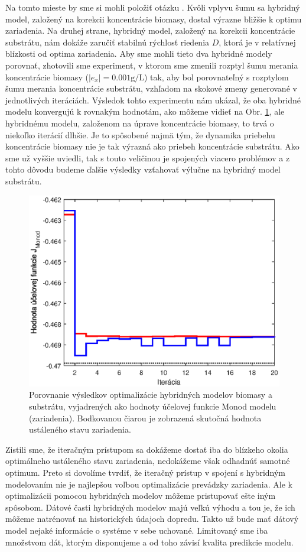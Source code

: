 Na tomto mieste by sme si mohli položiť otázku . Kvôli vplyvu šumu sa hybridný model, založený na korekcii koncentrácie biomasy, dostal výrazne bližšie k optimu zariadenia. Na druhej strane, hybridný model, založený na korekcii koncentrácie substrátu, nám dokáže zaručiť stabilnú rýchlosť riedenia $ D $, ktorá je v relatívnej blízkosti od optima zariadenia. Aby sme mohli tieto dva hybridné modely porovnať, zhotovili sme experiment, v ktorom sme zmenili rozptyl šumu merania koncentrácie biomasy ($ \left|e_{x}\right| = 0.001\si{\gram\per\liter} $) tak, aby bol porovnateľný s rozptylom šumu merania koncentrácie substrátu, vzhľadom na skokové zmeny generované v jednotlivých iteráciách. Výsledok tohto experimentu nám ukázal, že oba hybridné modelu konvergujú k rovnakým hodnotám, ako môžeme vidieť na Obr. \ref{fig:hybrid_sub_and_bio_compar}, ale hybridnému modelu, založenom na úprave koncentrácie biomasy, to trvá o niekoľko iterácií dlhšie. Je to spôsobené najmä tým, že dynamika priebehu koncentrácie biomasy nie je tak výrazná ako priebeh koncentrácie substrátu. Ako sme už vyššie uviedli, tak s touto veličinou je spojených viacero problémov a z tohto dôvodu budeme ďalšie výsledky vzťahovať výlučne na hybridný model substrátu. 
\begin{figure}
	\centering
	\includegraphics[width=0.7\linewidth]{images/hybrid_sub_and_bio_compar}
	\caption{Porovnanie výsledkov optimalizácie hybridných modelov biomasy a substrátu, vyjadrených ako hodnoty účelovej funkcie Monod modelu (zariadenia). Bodkovanou čiarou je zobrazená skutočná hodnota ustáleného stavu zariadenia.}
	\label{fig:hybrid_sub_and_bio_compar}
\end{figure}

Zistili sme, že iteračným prístupom sa dokážeme dostať iba do blízkeho okolia optimálneho ustáleného stavu zariadenia, nedokážeme však odhadnúť samotné optimum. Preto si dovolíme tvrdiť, že iteračný prístup v spojení s hybridným modelovaním nie je najlepšou voľbou optimalizácie prevádzky zariadenia. Ale k optimalizácii pomocou hybridných modelov môžeme pristupovať ešte iným spôsobom. Dátové časti hybridných modelov majú veľkú výhodu a tou je, že ich môžeme natrénovať na historických údajoch dopredu. Takto už bude mať dátový model nejaké informácie o systéme v sebe uchované. Limitovaný sme iba množstvom dát, ktorým disponujeme a od toho závisí kvalita predikcie modelu. 

